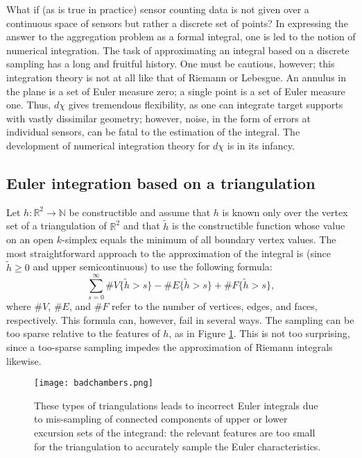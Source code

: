 \documentclass{psapm-l}
\theoremstyle{definition}
\theoremstyle{remark}
\numberwithin{equation}{section}
\begin{document}
What if (as is true in practice) sensor counting data is not given over a continuous space of sensors but rather a discrete set of points? In expressing the answer to the aggregation problem as a formal integral, one is led to the notion of numerical integration. The task of approximating an integral based on a discrete sampling has a long and fruitful history. One must be cautious, however; this integration theory is not at all like that of Riemann or Lebesgue.  An annulus in the plane is a set of Euler measure zero; a single point is a set of Euler measure one. Thus, $d\chi$ gives tremendous flexibility, as one can integrate target supports with vastly dissimilar geometry; however, noise, in the form of errors at individual sensors, can be fatal to the estimation of the integral. The development of numerical integration theory for $d\chi$ is in its infancy.

\subsection{Euler integration based on a triangulation}
\label{sec:triang}
Let $h\colon{{\mathbb R}}^2\to{{\mathbb N}}$ be constructible and assume that $h$ is known only over the vertex set of a triangulation of ${{\mathbb R}}^2$ and that $\tilde{h}$ is the constructible function whose value on an open $k$-simplex equals the minimum of all boundary vertex values. The most straightforward approach to the approximation of the integral is (since $\tilde{h}\geq 0$ and upper semicontinuous) to use the following formula:
\begin{equation}
\label{eq:combnumeuler}
    \sum_{s=0}^\infty \#V\{\tilde{h}>s\}-\#E\{\tilde{h}>s\}+\#F\{\tilde{h}>s\} ,
\end{equation}
where $\#V$, $\#E$, and $\#F$ refer to the number of vertices, edges, and faces, respectively. This formula can, however, fail in several ways. The sampling can be too sparse relative to the features of $h$, as in Figure \ref{fig:badchambers}. This is not too surprising, since a too-sparse sampling impedes the approximation of Riemann integrals likewise.

\begin{figure}[hbt]
\begin{center}
\texttt{[image: badchambers.png]}
\caption{These types of triangulations leads to incorrect Euler integrals due to mis-sampling of connected components of upper or lower excursion sets of the integrand: the relevant features are too small for the triangulation to accurately sample the Euler characteristics.}
\label{fig:badchambers}
\end{center}
\end{figure}
\end{document}
